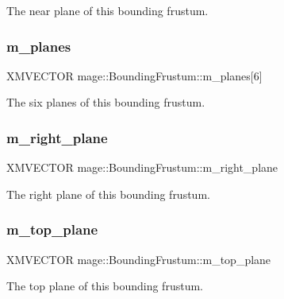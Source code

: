 The near plane of this bounding frustum. \hypertarget{classmage_1_1_bounding_frustum_a077e9ac802e5272dd9cf60a57546505c}{}\label{classmage_1_1_bounding_frustum_a077e9ac802e5272dd9cf60a57546505c} 
\subsubsection{\texorpdfstring{m\+\_\+planes}{m\_planes}}
{\footnotesize\ttfamily X\+M\+V\+E\+C\+T\+OR mage\+::\+Bounding\+Frustum\+::m\+\_\+planes\mbox{[}6\mbox{]}}

The six planes of this bounding frustum. \hypertarget{classmage_1_1_bounding_frustum_a28a9d13ade71eb4253e452e6c53c31fe}{}\label{classmage_1_1_bounding_frustum_a28a9d13ade71eb4253e452e6c53c31fe} 
\subsubsection{\texorpdfstring{m\+\_\+right\+\_\+plane}{m\_right\_plane}}
{\footnotesize\ttfamily X\+M\+V\+E\+C\+T\+OR mage\+::\+Bounding\+Frustum\+::m\+\_\+right\+\_\+plane}

The right plane of this bounding frustum. \hypertarget{classmage_1_1_bounding_frustum_acea4c43991bf09de647f7ee70feb1fff}{}\label{classmage_1_1_bounding_frustum_acea4c43991bf09de647f7ee70feb1fff} 
\subsubsection{\texorpdfstring{m\+\_\+top\+\_\+plane}{m\_top\_plane}}
{\footnotesize\ttfamily X\+M\+V\+E\+C\+T\+OR mage\+::\+Bounding\+Frustum\+::m\+\_\+top\+\_\+plane}

The top plane of this bounding frustum. 